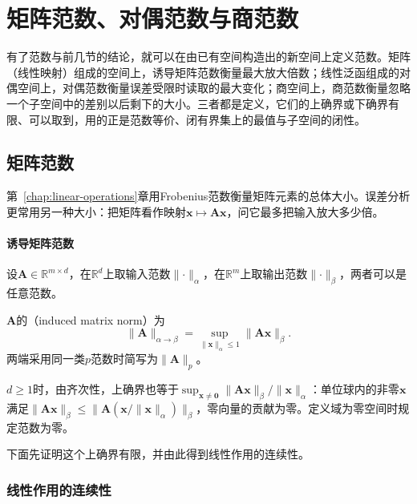 \section{矩阵范数、对偶范数与商范数}
\label{sec:ls-derived-norms}

有了范数与前几节的结论，就可以在由已有空间构造出的新空间上定义范数。矩阵（线性映射）组成的空间上，诱导矩阵范数衡量最大放大倍数；线性泛函组成的对偶空间上，对偶范数衡量误差受限时读取的最大变化；商空间上，商范数衡量忽略一个子空间中的差别以后剩下的大小。三者都是定义，它们的上确界或下确界有限、可以取到，用的正是范数等价、闭有界集上的最值与子空间的闭性。

\subsection{矩阵范数}
\label{sec:ls-matrix-norms}
\label{sec:ch06-map-comparison}
\label{sec:matrix-analysis-norms-effective-rank}
\label{sec:multivariable-operator-norm}

第~\ref{chap:linear-operations}章用Frobenius范数衡量矩阵元素的总体大小。误差分析更常用另一种大小：把矩阵看作映射$\bm x\mapsto\bm A\bm x$，问它最多把输入放大多少倍。

\paragraph{诱导矩阵范数}
设$\bm A\in\mathbb R^{m\times d}$，在$\mathbb R^d$上取输入范数$\lVert\cdot\rVert_\alpha$，在$\mathbb R^m$上取输出范数$\lVert\cdot\rVert_\beta$，两者可以是任意范数。
\begin{definition}[由向量范数诱导的矩阵范数]
\label{def:matrix-analysis-induced-norm}
$\bm A$的（induced matrix norm）为
\[
 \lVert\bm A\rVert_{\alpha\to\beta}
 =\sup_{\lVert\bm x\rVert_\alpha\leq1}\lVert\bm A\bm x\rVert_\beta .
\]
两端采用同一类$p$范数时简写为$\lVert\bm A\rVert_p$。
\end{definition}
$d\geq1$时，由齐次性，上确界也等于$\sup_{\bm x\neq\bm0}\lVert\bm A\bm x\rVert_\beta/\lVert\bm x\rVert_\alpha$：单位球内的非零$\bm x$满足$\lVert\bm A\bm x\rVert_\beta\leq\lVert\bm A(\bm x/\lVert\bm x\rVert_\alpha)\rVert_\beta$，零向量的贡献为零。定义域为零空间时规定范数为零。

下面先证明这个上确界有限，并由此得到线性作用的连续性。

\subsubsection{线性作用的连续性}
\label{sec:ls-linear-action-continuity}

